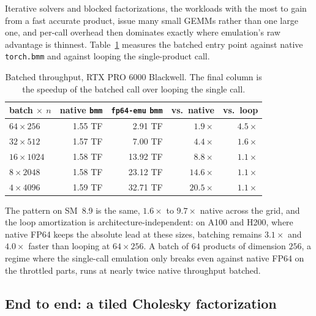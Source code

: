 \documentclass[11pt]{amsart}
\theoremstyle{plain}
\theoremstyle{definition}
\newcommand{\code}[1]{\texttt{#1}}
\newcommand{\fpemu}{\code{fp64-emu}}
\begin{document}
Iterative solvers and blocked factorizations, the workloads with the most
to gain from a fast accurate product, issue many small GEMMs rather than
one large one, and per-call overhead then dominates exactly where
emulation's raw advantage is thinnest. Table~\ref{tab:batched} measures
the batched entry point against native \code{torch.bmm} and against
looping the single-product call.

\begin{table}[t]
\centering
\caption{Batched throughput, RTX PRO 6000 Blackwell. The final column is
the speedup of the batched call over looping the single call.}
\label{tab:batched}
\begin{tabular}{lrrrr}
\toprule
batch $\times$ $n$ & native \code{bmm} & \fpemu{} \code{bmm} & vs.\ native & vs.\ loop \\
\midrule
$64 \times 256$ & 1.55 TF & 2.91 TF & $1.9\times$ & $4.5\times$ \\
$32 \times 512$ & 1.57 TF & 7.00 TF & $4.4\times$ & $1.6\times$ \\
$16 \times 1024$ & 1.58 TF & 13.92 TF & $8.8\times$ & $1.1\times$ \\
$8 \times 2048$ & 1.58 TF & 23.12 TF & $14.6\times$ & $1.1\times$ \\
$4 \times 4096$ & 1.59 TF & 32.71 TF & $20.5\times$ & $1.1\times$ \\
\bottomrule
\end{tabular}
\end{table}

The pattern on SM~8.9 is the same, $1.6\times$ to $9.7\times$ native
across the grid, and the loop amortization is architecture-independent:
on A100 and H200, where native FP64 keeps the absolute lead at these
sizes, batching remains $3.1\times$ and $4.0\times$ faster than looping
at $64 \times 256$. A batch of $64$ products of dimension $256$, a regime
where the single-call emulation only breaks even against native FP64 on
the throttled parts, runs at nearly twice native throughput batched.

\subsection{End to end: a tiled Cholesky factorization}\label{sec:e2e}
\end{document}
